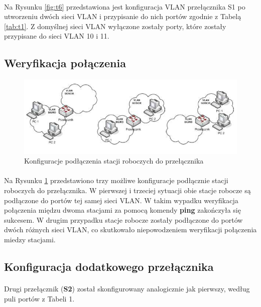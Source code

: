 \documentclass[wide,a4paper,titlepage,12pt] {article}
\begin{document}
  \paragraph{}
  Na Rysunku \ref{fig:t6} przedstawiona jest konfiguracja VLAN przełącznika S1 po utworzeniu dwóch sieci VLAN i przypisanie do nich portów zgodnie z Tabelą \ref{tab:t1}. Z domyślnej sieci VLAN wyłączone zostały porty, które zostały przypisane do sieci VLAN 10 i 11.

  \newpage
  \subsection{Weryfikacja połączenia}

  \begin{figure}[H]
    \begin{center}
      \includegraphics[width=\textwidth]{img/aa.PNG}
      \caption{Konfiguracje podłączenia stacji roboczych do przełącznika}
      \label{fig:aa}
    \end{center}
  \end{figure}

  \paragraph{}
  Na Rysunku \ref{fig:aa} przedstawiono trzy możliwe konfiguracje podłącznie stacji roboczych do przełącznika. W pierwszej i trzeciej sytuacji obie stacje robocze są podłączone do portów tej samej sieci VLAN. W takim wypadku weryfikacja połączenia międzu dwoma stacjami za pomocą komendy \textbf{ping} zakończyła się sukcesem. W drugim przypadku stacje robocze zostały podłączone do portów dwóch różnych sieci VLAN, co skutkowało niepowodzeniem weryfikacji połączenia miedzy stacjami.

  \subsection{Konfiguracja dodatkowego przełącznika}
  \paragraph{}
  Drugi przełącznik (\textbf{S2}) został skonfigurowany analogicznie jak pierwszy, według puli portów z Tabeli 1.
\end{document}
